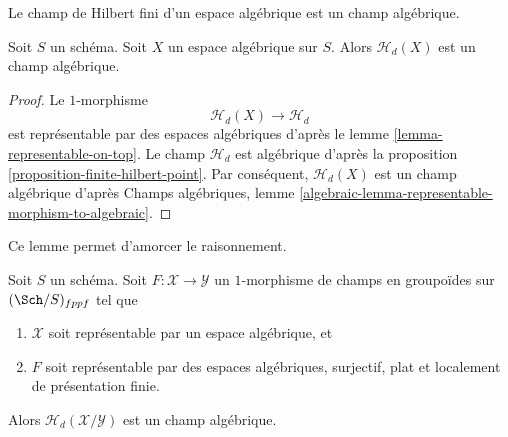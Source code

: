 \noindent
Le champ de Hilbert fini d'un espace algébrique est un champ algébrique.

\begin{lemma}
\label{lemma-hilbert-stack-of-space}
Soit $S$ un schéma.
Soit $X$ un espace algébrique sur $S$.
Alors $\mathcal{H}_d(X)$ est un champ algébrique.
\end{lemma}

\begin{proof}
Le $1$-morphisme
$$
\mathcal{H}_d(X) \longrightarrow \mathcal{H}_d
$$
est représentable par des espaces algébriques d'après le
lemme \ref{lemma-representable-on-top}.
Le champ $\mathcal{H}_d$ est algébrique d'après la
proposition \ref{proposition-finite-hilbert-point}.
Par conséquent, $\mathcal{H}_d(X)$ est un champ algébrique d'après
Champs algébriques,
lemme \ref{algebraic-lemma-representable-morphism-to-algebraic}.
\end{proof}

\noindent
Ce lemme permet d'amorcer le raisonnement.

\begin{lemma}
\label{lemma-hilbert-stack-relative-space}
Soit $S$ un schéma. Soit $F : \mathcal{X} \to \mathcal{Y}$ un $1$-morphisme
de champs en groupoïdes sur $(\Sch/S)_{fppf}$ tel que
\begin{enumerate}
\item $\mathcal{X}$ soit représentable par un espace algébrique, et
\item $F$ soit représentable par des espaces algébriques, surjectif, plat et
localement de présentation finie.
\end{enumerate}
Alors $\mathcal{H}_d(\mathcal{X}/\mathcal{Y})$ est un champ algébrique.
\end{lemma}

